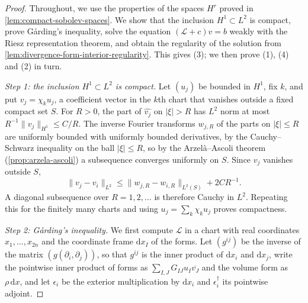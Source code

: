 \begin{proof}
Throughout, we use the properties of the spaces $H^r$ proved in \cref{lem:compact-sobolev-spaces}. We show that the inclusion $H^1\subset L^2$ is compact, prove G\aa rding's inequality, solve the equation $(\mathcal L+c)v=b$ weakly with the Riesz representation theorem, and obtain the regularity of the solution from \cref{lem:divergence-form-interior-regularity}. This gives (3); we then prove (1), (4) and (2) in turn.

\emph{Step 1: the inclusion $H^1\subset L^2$ is compact.} Let $(u_j)$ be bounded in $H^1$, fix $k$, and put $v_j=\chi_ku_j$, a coefficient vector in the $k$th chart that vanishes outside a fixed compact set $S$. For $R>0$, the part of $\widehat{v_j}$ on $|\xi|>R$ has $L^2$ norm at most $R^{-1}\|v_j\|_{H^1}\leq C/R$. The inverse Fourier transforms $w_{j,R}$ of the parts on $|\xi|\leq R$ are uniformly bounded with uniformly bounded derivatives, by the Cauchy--Schwarz inequality on the ball $|\xi|\leq R$, so by the Arzel\`a--Ascoli theorem (\cref{prop:arzela-ascoli}) a subsequence converges uniformly on $S$. Since $v_j$ vanishes outside $S$,
\[
 \|v_j-v_i\|_{L^2}\leq\|w_{j,R}-w_{i,R}\|_{L^2(S)}+2CR^{-1}.
\]
A diagonal subsequence over $R=1,2,\ldots$ is therefore Cauchy in $L^2$. Repeating this for the finitely many charts and using $u_j=\sum_k\chi_ku_j$ proves compactness.

\emph{Step 2: G\aa rding's inequality.} We first compute $\mathcal L$ in a chart with real coordinates $x_1,\ldots,x_{2n}$ and the coordinate frame $\mathrm dx_I$ of the forms. Let $(g^{ij})$ be the inverse of the matrix $(g(\partial_i,\partial_j))$, so that $g^{ij}$ is the inner product of $\mathrm dx_i$ and $\mathrm dx_j$, write the pointwise inner product of forms as $\sum_{I,J}G_{IJ}u_I\overline{v_J}$ and the volume form as $\rho\,\mathrm dx$, and let $\epsilon_i$ be the exterior multiplication by $\mathrm dx_i$ and $\epsilon_i^\dagger$ its pointwise adjoint.


\end{proof}
